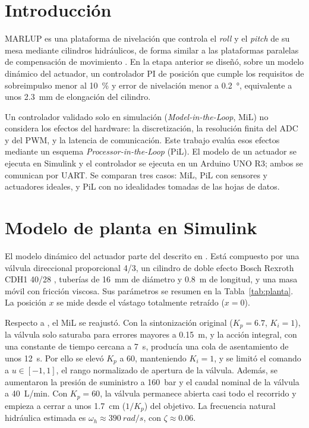 \documentclass[conference]{IEEEtran}
\begin{document}
\section{Introducción}
MARLUP es una plataforma de nivelación que controla el \textit{roll} y el \textit{pitch} de su mesa mediante cilindros hidráulicos, de forma similar a las plataformas paralelas de compensación de movimiento \cite{wang2025}. En la etapa anterior se diseñó, sobre un modelo dinámico del actuador, un controlador PI de posición que cumple los requisitos de sobreimpulso menor al \SI{10}{\percent} y error de nivelación menor a \SI{0.2}{\degree}, equivalente a unos \SI{2.3}{mm} de elongación del cilindro.

Un controlador validado solo en simulación (\textit{Model-in-the-Loop}, MiL) no considera los efectos del hardware: la discretización, la resolución finita del ADC y del PWM, y la latencia de comunicación. Este trabajo evalúa esos efectos mediante un esquema \textit{Processor-in-the-Loop} (PiL). El modelo de un actuador se ejecuta en Simulink y el controlador se ejecuta en un Arduino UNO R3; ambos se comunican por UART. Se comparan tres casos: MiL, PiL con sensores y actuadores ideales, y PiL con no idealidades tomadas de las hojas de datos.
\section{Modelo de planta en Simulink}
\label{sec:planta}

El modelo dinámico del actuador parte del descrito en \cite{avance2}. Está compuesto por una válvula direccional proporcional 4/3, un cilindro de doble efecto Bosch Rexroth CDH1 40/28 \cite{rexroth}, tuberías de \SI{16}{mm} de diámetro y \SI{0.8}{m} de longitud, y una masa móvil con fricción viscosa. Sus parámetros se resumen en la Tabla~\ref{tab:planta}. La posición $x$ se mide desde el vástago totalmente retraído ($x=0$).

Respecto a \cite{avance2}, el MiL se reajustó. Con la sintonización original ($K_p=6.7$, $K_i=1$), la válvula solo saturaba para errores mayores a \SI{0.15}{m}, y la acción integral, con una constante de tiempo cercana a \SI{7}{s}, producía una cola de asentamiento de unos \SI{12}{s}. Por ello se elevó $K_p$ a 60, manteniendo $K_i=1$, y se limitó el comando a $u\in[-1,1]$, el rango normalizado de apertura de la válvula. Además, se aumentaron la presión de suministro a \SI{160}{bar} y el caudal nominal de la válvula a \SI{40}{L/min}. Con $K_p=60$, la válvula permanece abierta casi todo el recorrido y empieza a cerrar a unos \SI{1.7}{cm} ($1/K_p$) del objetivo. La frecuencia natural hidráulica estimada es $\omega_h\approx\SI{390}{rad/s}$, con $\zeta\approx0.06$.
\end{document}
